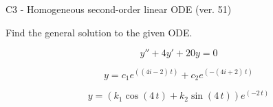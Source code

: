 \begin{exercise}
  \begin{exerciseTitle}C3 - Homogeneous second-order linear ODE (ver. 51)\end{exerciseTitle}
  \begin{exerciseStatement}
    
Find the general solution to the given ODE.

    
\[y''+4y'+20y = 0\]

  \end{exerciseStatement}
  \begin{exerciseAnswer}
    
\[y= c_{1} e^{\left(\left(4 i - 2\right) \, t\right)} + c_{2} e^{\left(-\left(4 i + 2\right) \, t\right)}\]

    
\[y= {\left(k_{1} \cos\left(4 \, t\right) + k_{2} \sin\left(4 \, t\right)\right)} e^{\left(-2 \, t\right)}\]

  \end{exerciseAnswer}
\end{exercise}